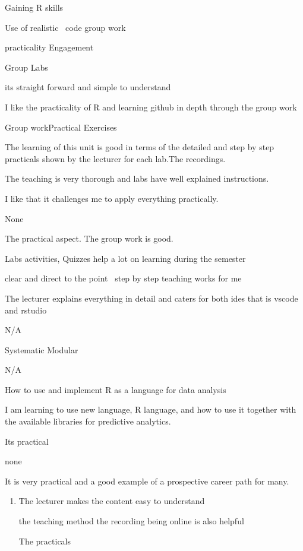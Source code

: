 \documentclass[
]{article}
\providecommand{\tightlist}{%
  \setlength{\itemsep}{0pt}\setlength{\parskip}{0pt}}
\begin{document}
\begin{enumerate}
\begin{itemize}
    Gaining R skills

    Use of realistic~ code group work

    practicality Engagement

    Group Labs

    its straight forward and simple to understand~

    I like the practicality of R and learning github in depth through
    the group work

    Group workPractical Exercises

    The learning of this unit is good in terms of the detailed and step
    by step practicals shown by the lecturer for each lab.The
    recordings.

    The teaching is very thorough and labs have well explained
    instructions.

    I like that it challenges me to apply everything practically.

    None

    The practical aspect. The group work is good.

    Labs activities, Quizzes help a lot on learning during the semester

    clear and direct to the point~ step by step teaching works for me

    The lecturer explains everything in detail and caters for both ides
    that is vscode and rstudio

    N/A

    Systematic Modular

    N/A~

    How to use and implement R as a language for data analysis

    I am learning to use new language, R language, and how to use it
    together with the available libraries for predictive analytics. ~

    Its practical~

    none

    It is very practical and a good example of a prospective career path
    for many.

    \begin{enumerate}
    \def\labelenumii{\arabic{enumii}.}
    \tightlist
    \item
      The lecturer makes the content easy to understand

      the teaching method the recording being online is also helpful~

      The practicals
    \end{enumerate}
  \end{itemize}
\end{enumerate}
\end{document}
